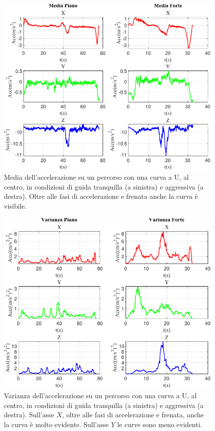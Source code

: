 \documentclass[class=article]{standalone}
\begin{document}
	\begin{center}
		\begin{figure}[h!]
			\centering\includegraphics[width=.7\textwidth]{img/CurvaUFP/Acc/Media}
			\caption[]{Media dell'accelerazione su un percorso con una curva a U, al centro, in condizioni di guida tranquilla (a sinistra) e aggressiva (a destra). Oltre alle fasi di accelerazione e frenata anche la curva è visibile.}
			\label{fig:AccMedia_CurvaUFP}
		\end{figure}
	\end{center}
	
	\begin{center}
		\begin{figure}[h!]
			\centering\includegraphics[width=.7\textwidth]{img/curvaUFP/Acc/Varianza}
			\caption[]{Varianza dell'accelerazione su un percorso con una curva a U, al centro, in condizioni di guida tranquilla (a sinistra) e aggressiva (a destra). Sull'asse \(X\), oltre alle fasi di accelerazione e frenata, anche la curva è molto evidente. Sull'asse \(Y\) le curve sono meno evidenti.}
			\label{fig:AccVar_curvaUFP}
		\end{figure}
	\end{center}
	
\end{document}
